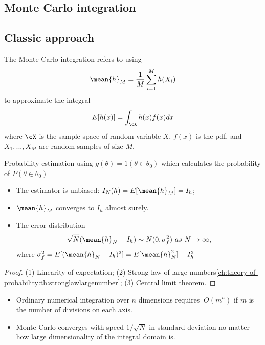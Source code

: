 \begin{refsection}
\section{Monte Carlo integration}


\subsection{Classic approach}
\begin{definition}
	The Monte Carlo integration refers to using
	$$\mean{h}_M = \frac{1}{M}\sum_{i=1}^M h(X_i)$$
	to approximate the integral
	$$E[h(x)] = \int_\cX h(x)f(x)dx$$
	where $\cX$ is the sample space of random variable $X$, $f(x)$ is the pdf, and $X_1,...,X_M$ are random samples of size $M$.
\end{definition}

\begin{example}
	Probability estimation using $g(\theta) = 1(\theta\in \theta_0)$ which calculates the probability of $P(\theta\in \theta_0)$
\end{example}



\begin{lemma}\cite{andrieu2003introduction}\hfill
	\begin{itemize}
		\item The estimator is unbiased: $I_N(h) = E[\mean{h}_M] = I_h$;
		\item $\mean{h}_M $ converges to $I_h$ almost surely.
		\item The error distribution $$\sqrt{N}(\mean{h}_N - I_h)\sim N(0,\sigma_f^2) ~as~ N \to \infty,$$ where $\sigma^2_f = E[(\mean{h}_N - I_h)^2] = E[\mean{h}_N^2] - I_h^2$
	\end{itemize}
\end{lemma}
\begin{proof}
	(1) Linearity of expectation; (2) Strong law of large numbers\autoref{ch:theory-of-probability:th:stronglawlargenumber}; (3) Central limit theorem.
\end{proof}


\begin{remark}\hfill
	\begin{itemize}
		\item Ordinary numerical integration over $n$ dimensions requires $~O(m^n)$ if $m$ is the number of divisions on each axis.
		\item Monte Carlo converges with speed $1/\sqrt{N}$ in standard deviation no matter how large dimensionality of the integral domain is.
	\end{itemize}
\end{remark}




\end{refsection}
